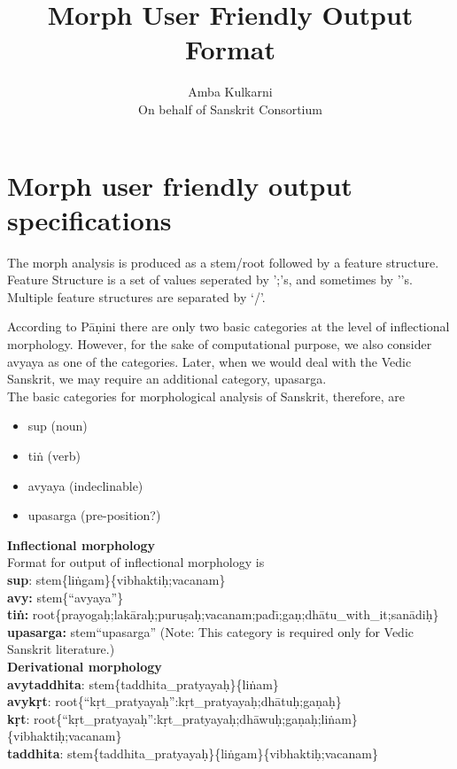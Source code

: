 \documentclass{article}
\begin{document}
\title{Morph User Friendly Output Format}
\author{Amba Kulkarni \\On behalf of Sanskrit Consortium}

\frenchspacing
\noindent
\maketitle

\section{Morph user friendly output specifications}
The morph analysis is produced as a stem/root followed by a feature structure.
Feature Structure is a set of values seperated by ';'s, and sometimes by '{}'s. Multiple feature structures are separated by `/'.

According to P{\=a}\d{n}ini there are only two basic categories at the level of inflectional morphology. However, for the sake of computational purpose, we also consider avyaya as one of the categories. Later, when we would deal with the Vedic Sanskrit, we may require an additional category, upasarga.\\

\noindent 
The basic categories for morphological analysis of Sanskrit, therefore, are 

\begin{itemize}
\item sup (noun)
\item ti\.{n} (verb)
\item avyaya (indeclinable)
\item upasarga (pre-position?)
\end{itemize}

\noindent 
\textbf {Inflectional morphology}\\
Format for output of inflectional morphology is\\
\textbf{sup}:  stem\{li\.{n}gam\}\{vibhakti\d{h};vacanam\}\\
\textbf{avy:}  stem\{``avyaya''\}\\
\textbf{ti\.{n}:} root\{prayoga\d{h};lak{\=a}ra\d{h};puru\d{s}a\d{h};vacanam;pad{\=\i};ga\d{n};dh{\=a}tu\_with\_it;san{\=a}di\d{h}\} \\
\textbf{upasarga:}  stem{``upasarga''} (Note: This category is required only for Vedic Sanskrit literature.)\\

\noindent 
\textbf {Derivational morphology}\\
\textbf{avytaddhita}: stem\{taddhita\_pratyaya\d{h}\}\{li\.{n}am\} \\
\textbf{avyk\d{r}t}: root\{``k\d{r}t\_pratyaya\d{h}'':k\d{r}t\_pratyaya\d{h};dh{\=a}tu\d{h};ga\d{n}a\d{h}\} \\
\textbf{k\d{r}t}:  root\{``k\d{r}t\_pratyaya\d{h}'':k\d{r}t\_pratyaya\d{h};dh{\=a}wu\d{h};ga\d{n}a\d{h};li\.{n}am\}\{vibhakti\d{h};vacanam\}\\
\textbf{taddhita}: stem\{taddhita\_pratyaya\d{h}\}\{li\.{n}gam\}\{vibhakti\d{h};vacanam\}\\
\end{document}
